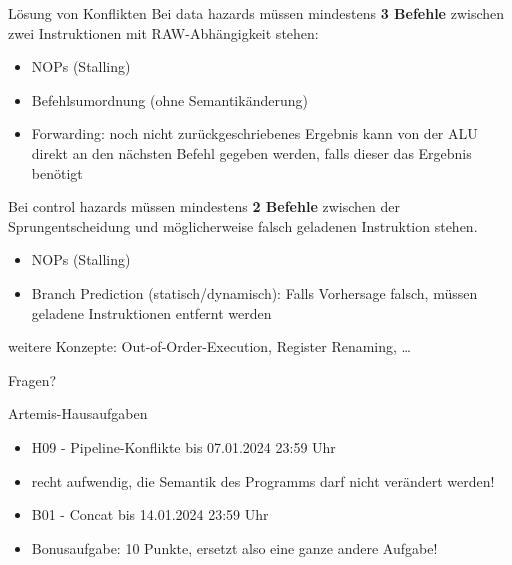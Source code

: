 \begin{frame}[c, fragile]{Lösung von Konflikten}
	Bei data hazards müssen mindestens \textbf{3 Befehle} zwischen zwei Instruktionen mit RAW-Abhängigkeit stehen:
	\begin{itemize}
		\item NOPs (Stalling)
		\item Befehlsumordnung (ohne Semantikänderung)
		\item Forwarding: noch nicht zurückgeschriebenes Ergebnis kann von der ALU direkt an den nächsten Befehl gegeben werden, falls dieser das Ergebnis benötigt
	\end{itemize}
	\vspace{0.5cm}
	Bei control hazards müssen mindestens \textbf{2 Befehle} zwischen der Sprungentscheidung und möglicherweise falsch geladenen Instruktion stehen.
	\begin{itemize}
		\item NOPs (Stalling)
		\item Branch Prediction (statisch/dynamisch): Falls Vorhersage falsch, müssen geladene Instruktionen entfernt werden
	\end{itemize}
	\vspace{0.5cm}
	weitere Konzepte: Out-of-Order-Execution, Register Renaming, \ldots
\end{frame}

\begin{frame}[c]{}{}
	\begin{center}
		\LARGE Fragen?
	\end{center}
\end{frame}

\begin{frame}[c, fragile]{Artemis-Hausaufgaben}{}
	\begin{itemize}
		\item H09 - Pipeline-Konflikte bis 07.01.2024 23:59 Uhr
		\item recht aufwendig, die Semantik des Programms darf nicht verändert werden!
		\item B01 - Concat bis 14.01.2024 23:59 Uhr
		\item Bonusaufgabe: 10 Punkte, ersetzt also eine ganze andere Aufgabe!
	\end{itemize}
\end{frame}

